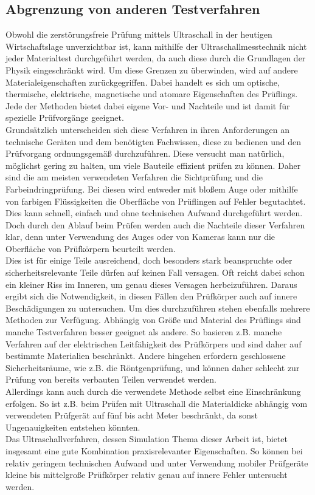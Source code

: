 \documentclass[reducespace,stylepage,semiarbeit]{spezidoc}
\begin{document}
\subsection{Abgrenzung von anderen Testverfahren}

Obwohl die zerstörungsfreie Prüfung mittels Ultraschall in der heutigen Wirtschaftslage unverzichtbar ist, kann mithilfe der Ultraschallmesstechnik nicht jeder Materialtest durchgeführt werden, da auch diese durch die Grundlagen der Physik eingeschränkt wird.
Um diese Grenzen zu überwinden, wird auf andere Materialeigenschaften zurückgegriffen.
Dabei handelt es sich um optische, thermische, elektrische, magnetische und atomare Eigenschaften des Prüflings. 
Jede der Methoden bietet dabei eigene Vor- und Nachteile und ist damit für spezielle Prüfvorgänge geeignet. \\ 
Grundsätzlich unterscheiden sich diese Verfahren in ihren Anforderungen an technische Geräten und dem benötigten Fachwissen, diese zu bedienen und den Prüfvorgang ordnungsgemäß durchzuführen. 
Diese versucht man natürlich, möglichst gering zu halten, um viele Bauteile effizient prüfen zu können.
Daher sind die am meisten verwendeten Verfahren die Sichtprüfung und die Farbeindringprüfung. 
Bei diesen wird entweder mit bloßem Auge oder mithilfe von farbigen Flüssigkeiten die Oberfläche von Prüflingen auf Fehler begutachtet. 
Dies kann schnell, einfach und ohne technischen Aufwand durchgeführt werden.
Doch durch den Ablauf beim Prüfen werden auch die Nachteile dieser Verfahren klar, denn unter Verwendung des Auges oder von Kameras kann nur die Oberfläche von Prüfkörpern beurteilt werden. \\
Dies ist für einige Teile ausreichend, doch besonders stark beanspruchte oder sicherheitsrelevante Teile dürfen auf keinen Fall versagen. 
Oft reicht dabei schon ein kleiner Riss im Inneren, um genau dieses Versagen herbeizuführen. 
Daraus ergibt sich die Notwendigkeit, in diesen Fällen den Prüfkörper auch auf innere Beschädigungen zu untersuchen.
Um dies durchzuführen stehen ebenfalls mehrere Methoden zur Verfügung.
Abhängig von Größe und Material des Prüflings sind manche Testverfahren besser geeignet als andere. 
So basieren z.B. manche Verfahren auf der elektrischen Leitfähigkeit des Prüfkörpers und sind daher auf bestimmte Materialien beschränkt.
Andere hingehen erfordern geschlossene Sicherheitsräume, wie z.B. die Röntgenprüfung, und können daher schlecht zur Prüfung von bereits verbauten Teilen verwendet werden.\\
Allerdings kann auch durch die verwendete Methode selbst eine Einschränkung erfolgen. So ist z.B. beim Prüfen mit Ultraschall die Materialdicke abhängig vom verwendeten Prüfgerät auf fünf bis acht Meter beschränkt, da sonst Ungenauigkeiten entstehen könnten.\\
Das Ultraschallverfahren, dessen Simulation Thema dieser Arbeit ist, bietet insgesamt eine gute Kombination praxisrelevanter
 Eigenschaften. So können bei relativ geringem technischen Aufwand und unter Verwendung mobiler Prüfgeräte kleine bis mittelgroße Prüfkörper relativ genau auf innere Fehler untersucht werden.
\end{document}
